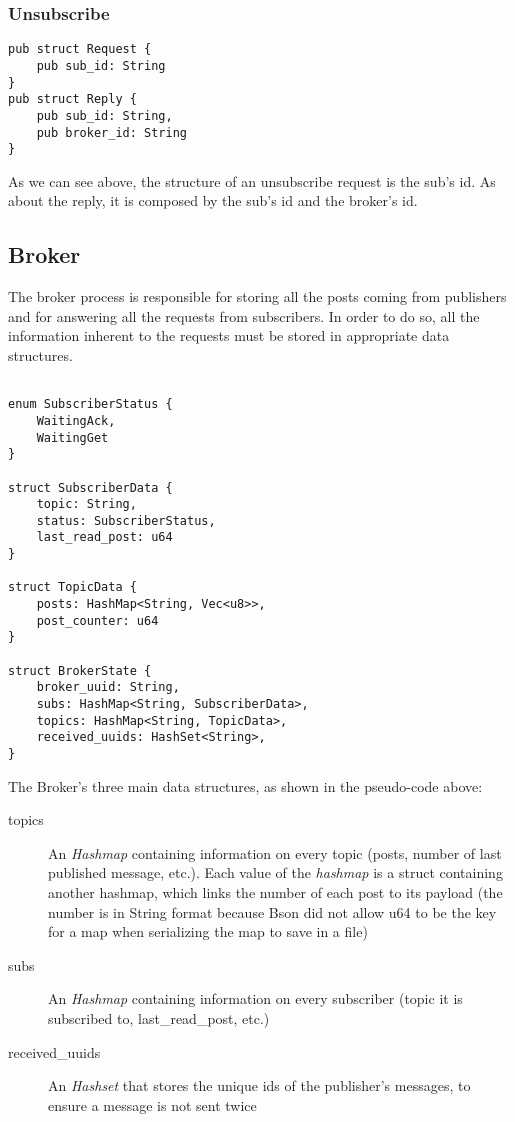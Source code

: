 \subsubsection{Unsubscribe}

\begin{lstlisting}
pub struct Request {
    pub sub_id: String
}
pub struct Reply {
    pub sub_id: String,
    pub broker_id: String
}
\end{lstlisting}
As we can see above, the structure of an unsubscribe request is the sub's id. As about the reply, it is composed by the sub's id and the broker's id.

\subsection{Broker}

The broker process is responsible for storing all the posts coming from publishers and for answering all the requests from subscribers. In order to do so, all the information inherent to the requests must be stored in appropriate data structures.

\begin{lstlisting}

enum SubscriberStatus {
    WaitingAck,
    WaitingGet
}

struct SubscriberData {
    topic: String,
    status: SubscriberStatus,
    last_read_post: u64
}

struct TopicData {
    posts: HashMap<String, Vec<u8>>,
    post_counter: u64
}

struct BrokerState {
    broker_uuid: String,
    subs: HashMap<String, SubscriberData>,
    topics: HashMap<String, TopicData>,
    received_uuids: HashSet<String>,
}
\end{lstlisting}

The Broker's three main data structures, as shown in the pseudo-code above:

\begin{description}
    \item[topics] An \emph{Hashmap} containing information on every topic (posts, number of last published message, etc.). Each value of the \emph{hashmap} is a struct containing another hashmap, which links the number of each post to its payload (the number is in String format because Bson did not allow u64 to be the key for a map when serializing the map to save in a file) 
    \item[subs] An \emph{Hashmap} containing information on every subscriber (topic it is subscribed to, last\_read\_post, etc.)
    \item[received\_uuids] An \emph{Hashset} that stores the unique ids of the publisher's messages, to ensure a message is not sent twice
\end{description}

